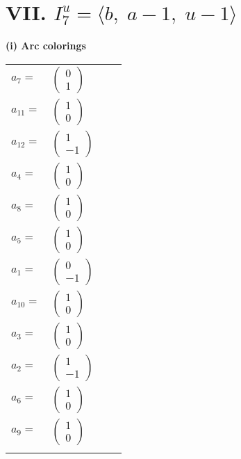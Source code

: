 \documentclass[1p]{elsarticle_modified}
\theoremstyle{definition}
\begin{document}
\centering \section*{VII. $I^u_{7}= \langle b,\;a-1,\;u-1 \rangle$}
\flushleft \textbf{(i) Arc colorings}\\
\begin{tabular}{m{7pt} m{180pt} m{7pt} m{180pt} }
\flushright $a_{7}=$&$\begin{pmatrix}0\\1\end{pmatrix}$ \\
\flushright $a_{11}=$&$\begin{pmatrix}1\\0\end{pmatrix}$ \\
\flushright $a_{12}=$&$\begin{pmatrix}1\\-1\end{pmatrix}$ \\
\flushright $a_{4}=$&$\begin{pmatrix}1\\0\end{pmatrix}$ \\
\flushright $a_{8}=$&$\begin{pmatrix}1\\0\end{pmatrix}$ \\
\flushright $a_{5}=$&$\begin{pmatrix}1\\0\end{pmatrix}$ \\
\flushright $a_{1}=$&$\begin{pmatrix}0\\-1\end{pmatrix}$ \\
\flushright $a_{10}=$&$\begin{pmatrix}1\\0\end{pmatrix}$ \\
\flushright $a_{3}=$&$\begin{pmatrix}1\\0\end{pmatrix}$ \\
\flushright $a_{2}=$&$\begin{pmatrix}1\\-1\end{pmatrix}$ \\
\flushright $a_{6}=$&$\begin{pmatrix}1\\0\end{pmatrix}$ \\
\flushright $a_{9}=$&$\begin{pmatrix}1\\0\end{pmatrix}$\\&\end{tabular}
\end{document}
